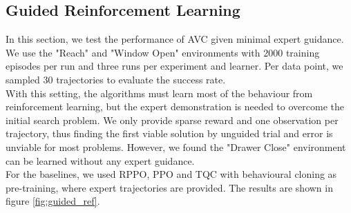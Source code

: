 \subsection{Guided Reinforcement Learning}
\label{sec:g_ref_ler}
In this section, we test the performance of AVC given minimal expert guidance. We use the "Reach" and "Window Open" environments with 2000 training episodes per run and three runs per experiment and learner.
Per data point, we sampled 30 trajectories to evaluate the success rate.\\
With this setting, the algorithms must learn most of the behaviour from reinforcement learning, but the expert
demonstration is needed to overcome the initial search problem. We only provide sparse reward and one observation per trajectory, thus finding the first viable solution by unguided
trial and error is unviable for most problems. However, we found the "Drawer Close" environment can be learned without any expert guidance.\\
For the baselines, we used RPPO, PPO and TQC with behavioural cloning as pre-training, where expert trajectories are provided. The results
are shown in figure \ref{fig:guided_ref}.

